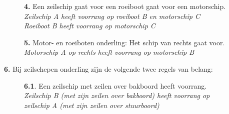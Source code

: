 \vspace{-0.7cm}
\begin{figure}[H]
	\centering
	\begin{minipage}[t]{0.70\textwidth}
		\textbf{4.} Een zeilschip gaat voor een roeiboot gaat voor een motorschip.\\
		\textit{Zeilschip A heeft voorrang op roeiboot B en motorschip C\\
			Roeiboot B heeft voorrang op motorschip C}
	\end{minipage}
	\hfill
	\begin{minipage}[t]{0.20\textwidth}
		\label{pic:kr4}
	\end{minipage}
	\hfill
\end{figure}

\vspace{-0.7cm}
\begin{figure}[H]
	\centering
	\begin{minipage}[t]{0.70\textwidth}
		\textbf{5.} Motor- en roeiboten onderling: Het schip van rechts gaat voor.\\
		\textit{Motorschip A op rechts heeft voorrang op motorschip B}
	\end{minipage}
	\hfill
	\begin{minipage}[t]{0.20\textwidth}
		\label{pic:kr5}
	\end{minipage}
	\hfill
\end{figure}

\vspace{-0.7cm}

\textbf{6.} Bij zeilschepen onderling zijn de volgende twee regels van belang:
\vspace{-0.5cm}
\begin{figure}[H]
	\centering
	\hspace{0.02\textwidth}
	\begin{minipage}[t]{0.70\textwidth}
		\textbf{6.1}. Een zeilschip met zeilen over bakboord heeft voorrang.\\
		\textit{Zeilschip B (met zijn zeilen over bakboord) heeft voorrang op \\zeilschip A (met zijn zeilen over stuurboord)}
	\end{minipage}
	\hfill
	\begin{minipage}[t]{0.20\textwidth}
		\label{pic:kr41}
	\end{minipage}
	\hfill
\end{figure}

